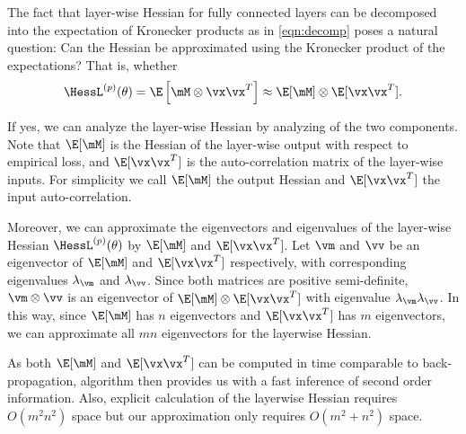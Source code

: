 \label{sec:hessian}


The fact that layer-wise Hessian for fully connected layers can be decomposed into the expectation of Kronecker products as in \cref{eqn:decomp} poses a natural question: Can the Hessian be approximated using the Kronecker product of the expectations? That is, whether 
\begin{equation}
    \HessL^{(p)}(\theta) = \E\left[\mM\otimes \vx\vx^T\right] \approx \E[\mM] \otimes \E[\vx\vx^T]. 
\end{equation}


If yes, we can analyze the layer-wise Hessian by analyzing of the two components. Note that $\E[\mM]$ is the Hessian of the layer-wise output with respect to empirical loss, and $\E[\vx\vx^T]$ is the auto-correlation matrix of the layer-wise inputs. For simplicity we call $\E[\mM]$ the output Hessian and $\E[\vx\vx^T]$ the input auto-correlation. 

Moreover, we can approximate the eigenvectors and eigenvalues of the layer-wise Hessian $\HessL^{(p)}(\theta)$ by $\E[\mM]$ and $\E[\vx\vx^T]$. Let $\vm$ and $\vv$ be an eigenvector of $\E[\mM]$ and $\E[\vx\vx^T]$ respectively, with corresponding eigenvalues $\lambda_\vm$ and $\lambda_\vv$. Since both matrices are positive semi-definite, $\vm \otimes \vv$ is an eigenvector of $\E[\mM] \otimes \E[\vx\vx^T]$ with eigenvalue $\lambda_\vm\lambda_\vv$. In this way, since $\E[\mM]$ has $n$ eigenvectors and $\E[\vx\vx^T]$ has $m$ eigenvectors, we can approximate all $mn$ eigenvectors for the layerwise Hessian.

As both $\E[\mM]$ and $\E[\vx\vx^T]$ can be computed in time comparable to back-propagation, algorithm then provides us with a fast inference of second order information. Also, explicit calculation of the layerwise Hessian requires $O(m^2n^2)$ space but our approximation only requires $O(m^2+n^2)$ space. 

